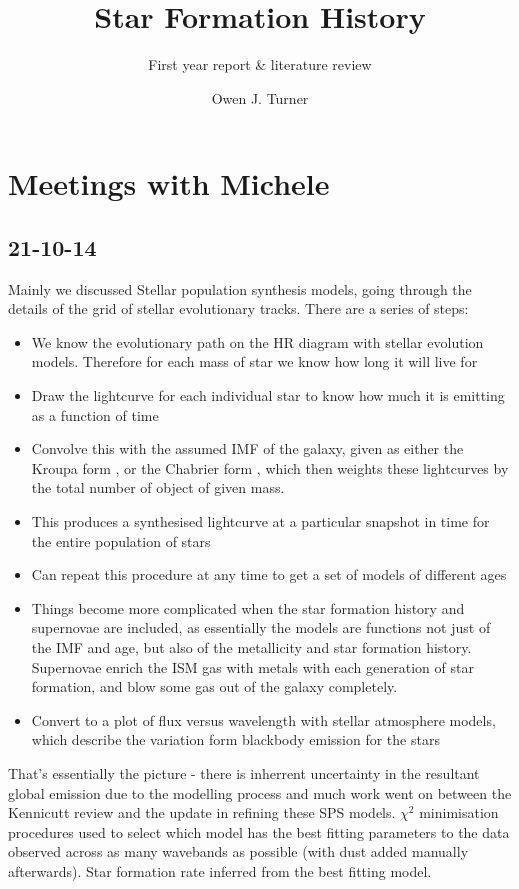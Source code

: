 \documentclass{literature}
\title{Star Formation History}
\subtitle{First year report \& literature review}
\author{Owen J. Turner}
\begin{document}
\background
\label{background}





\section{Meetings with Michele}\label{meetings}
\subsection{21-10-14}\label{meeting_1}
Mainly we discussed Stellar population synthesis models, going through the details of the grid of stellar evolutionary tracks. There are a series of steps: 
\begin{itemize}
\item We know the evolutionary path on the HR diagram with stellar evolution models. Therefore for each mass of star we know how long it will live for 
\item Draw the lightcurve for each individual star to know how much it is emitting as a function of time 
\item Convolve this with the assumed IMF of the galaxy, given as either the Kroupa form \citep{Kroupa1993}, or the Chabrier form \citep{Chabrier2003}, which then weights these lightcurves by the total number of object of given mass. 
\item This produces a synthesised lightcurve at a particular snapshot in time for the entire population of stars 
\item Can repeat this procedure at any time to get a set of models of different ages 
\item Things become more complicated when the star formation history and supernovae are included, as essentially the models are functions not just of the IMF and age, but also of the metallicity and star formation history. Supernovae enrich the ISM gas with metals with each generation of star formation, and blow some gas out of the galaxy completely. 
\item Convert to a plot of flux versus wavelength with stellar atmosphere models, which describe the variation form blackbody emission for the stars   
\end{itemize}
That's essentially the picture - there is inherrent uncertainty in the resultant global emission due to the modelling process and much work went on between the Kennicutt review and the update in refining these SPS models. $\chi ^{2}$ minimisation procedures used to select which model has the best fitting parameters to the data observed across as many wavebands as possible (with dust added manually afterwards). Star formation rate inferred from the best fitting model. \\
\end{document}
